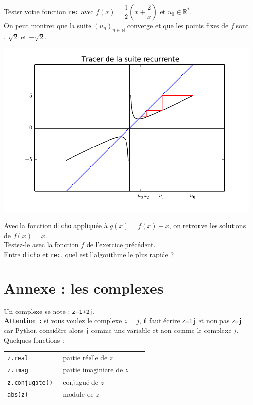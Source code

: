 \noindent \begin{minipage}{10cm}
\begin{exercice}\label{racine}
Tester votre fonction \verb?rec? avec $f(x)=\dfrac{1}{2}\left(x+\dfrac{2}{x}\right)$ et $u_0\in\mathbb{R}^*$.\\
On peut montrer que la suite $(u_n)_{n\in\mathbb{N}}$ converge et que les points fixes de $f$ sont : $\sqrt{2}$ et $-\sqrt{2}$. 
\end{exercice}
\end{minipage}
\begin{minipage}{10cm}
\includegraphics[scale=0.5]{Dessin/TracerSuite.pdf}
\end{minipage}



\begin{exercice}
Avec la fonction \verb?dicho? appliqu\' ee \` a $g(x)=f(x)-x$, on retrouve les solutions de $f(x)=x$.\\
Testez-le avec la fonction $f$ de l'exercice pr\' ec\' edent.\\
Entre \verb?dicho? et \verb?rec?, quel est l'algorithme le plus rapide ? 
\end{exercice}


\newpage


\section{Annexe : les complexes}
\noindent Un complexe se note : \verb?z=1+2j?. \\
\textbf{Attention :} si vous voulez le complexe $z=j$, il faut \' ecrire \verb?z=1j? et non pas \verb?z=j? car Python consid\` ere alors \verb?j? comme une variable et non comme le complexe $j$.\\
Quelques fonctions :\\
\begin{tabular}{llll}
\verb?z.real ? & partie r\' eelle de $z$\\
\verb?z.imag ? & partie imaginiare de $z$\\
\verb?z.conjugate() ? & conjugu\' e de $z$\\
\verb?abs(z) ? & module de $z$
\end{tabular}




